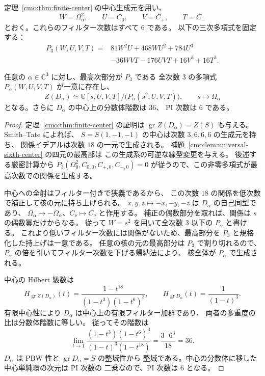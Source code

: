 定理~\ref{cmo:thm:finite-center} の中心生成元を用い、
\[
 W=\Omega_\alpha^2,\qquad U=C_0,\qquad V=C_+,\qquad T=C_-
\]
とおく。これらのフィルター次数はすべて $6$ である。
以下の三次多項式を固定する：
\begin{equation}
\begin{split}
 P_3(W,U,V,T)={}&81W^2U+468WU^2+784U^3\\
 &-36WVT-176UVT+16V^3+16T^3.
\end{split}
\label{cmo:eq:center-cubic-top}
\end{equation}

\begin{proposition}[中心の一関係表示と PI 次数]
\label{cmo:prop:center-hypersurface-degree}
任意の $\alpha\in\mathbb C^3$ に対し、最高次部分が $P_3$ である
全次数 $3$ の多項式 $P_\alpha(W,U,V,T)$ が一意に存在し、
\begin{equation}
 Z(D_\alpha)\simeq
 \mathbb C[s,U,V,T]/\bigl(P_\alpha(s^2,U,V,T)\bigr),
 \qquad s\longmapsto\Omega_\alpha
 \label{cmo:eq:center-hypersurface}
\end{equation}
となる。さらに $D_\alpha$ の中心上の分数体階数は $36$、
PI 次数は $6$ である。
\end{proposition}

\begin{proof}
定理~\ref{cmo:thm:finite-center} の証明は
$\operatorname{gr}Z(D_\alpha)=Z(S)$ も与える。
Smith--Tate \cite[Theorem~4.8]{GRSklyaninST} によれば、
$S=S(1,-1,-1)$ の中心は次数 $3,6,6,6$ の生成元を持ち、
関係イデアルは次数 $18$ の一元で生成される。
補題~\ref{cmo:lem:universal-sixth-center} の四元の最高部は
この生成系の可逆な線型変更を与える。
後述する厳密計算から $P_3(\Omega_0^2,C_{0,0},C_{+,0},C_{-,0})=0$
が従うので、この非零多項式が最高次数での関係を生成する。

中心への全射はフィルター付きで狭義であるから、
この次数 $18$ の関係を低次数で補正して核の元に持ち上げられる。
$x,y,z\mapsto-x,-y,-z$ は $D_\alpha$ の自己同型であり、
$\Omega_\alpha\mapsto-\Omega_\alpha$、$C_\nu\mapsto C_\nu$ と作用する。
補正の偶数部分を取れば、関係は $s$ の偶数冪だけからなる。
従って $W=s^2$ を用いて全次数 $3$ 以下の $P_\alpha$ と書ける。
これより低いフィルター次数には関係がないため、最高部分を
$P_3$ と規格化した持上げは一意である。
任意の核の元の最高部分は $P_3$ で割り切れるので、
$P_\alpha$ の倍を引いてフィルター次数を下げる帰納法により、
核全体が $P_\alpha$ で生成される。

中心の Hilbert 級数は
\[
 H_{\operatorname{gr}Z(D_\alpha)}(t)=
 \frac{1-t^{18}}{(1-t^3)(1-t^6)^3},
 \qquad H_{\operatorname{gr}D_\alpha}(t)=\frac1{(1-t)^3}.
\]
有限中心性により $D_\alpha$ は中心上の有限フィルター加群であり、
両者の多重度の比は分数体階数に等しい。
従ってその階数は
\[
 \lim_{t\to1}
 \frac{(1-t^3)(1-t^6)^3}{(1-t)^3(1-t^{18})}
 =\frac{3\cdot6^3}{18}=36.
\]
$D_\alpha$ は PBW 性と $\operatorname{gr}D_\alpha=S$ の整域性から
整域である。中心の分数体に移した中心単純環の次元は PI 次数の
二乗なので、PI 次数は $6$ となる。
\end{proof}

